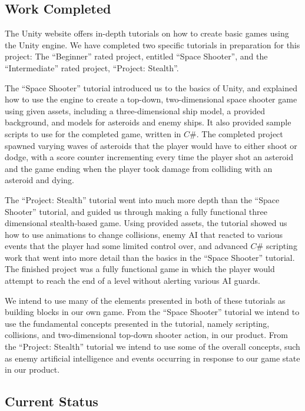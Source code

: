 \documentclass[12pt]{article}       %
\def\hs{\hspace{15pt}}
\begin{document}
\subsection{Work Completed}

\hs The Unity website offers in-depth tutorials on how to create basic games using the Unity engine. We have completed two specific tutorials in preparation for this project: The “Beginner” rated project, entitled “Space Shooter”, and the “Intermediate” rated project, “Project: Stealth”.

  The “Space Shooter” tutorial introduced us to the basics of Unity, and explained how to use the engine to create a top-down, two-dimensional space shooter game using given assets, including a three-dimensional ship model, a provided background, and models for asteroids and enemy ships. It also provided sample scripts to use for the completed game, written in $C\#$. The completed project spawned varying waves of asteroids that the player would have to either shoot or dodge, with a score counter incrementing every time the player shot an asteroid and the game ending when the player took damage from colliding with an asteroid and dying.

 The “Project: Stealth” tutorial went into much more depth than the “Space Shooter” tutorial, and guided us through making a fully functional three dimensional stealth-based game. Using provided assets, the tutorial showed us how to use animations to change collisions, enemy AI that reacted to various events that the player had some limited control over, and advanced $C\#$ scripting work that went into more detail than the basics in the “Space Shooter” tutorial. The finished project was a fully functional game in which the player would attempt to reach the end of a level without alerting various AI guards.

  We intend to use many of the elements presented in both of these tutorials as building blocks in our own game. From the “Space Shooter” tutorial we intend to use the fundamental concepts presented in the tutorial, namely scripting, collisions, and two-dimensional top-down shooter action, in our product. From the “Project: Stealth” tutorial we intend to use some of the overall concepts, such as enemy artificial intelligence and events occurring in response to our game state in our product.

\subsection{Current Status}
\end{document}
